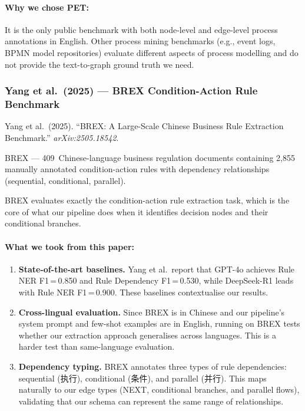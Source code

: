 \documentclass[12pt,a4paper]{article}
\begin{document}
\paragraph{Why we chose PET:} It is the only public benchmark with both node-level and edge-level process annotations in English. Other process mining benchmarks (e.g., event logs, BPMN model repositories) evaluate different aspects of process modelling and do not provide the text-to-graph ground truth we need.

\subsubsection{Yang et al.\ (2025) --- BREX Condition-Action Rule Benchmark}
\label{sec:brex}

\begin{description}[leftmargin=2em]
    \item[Paper:] Yang et al.\ (2025). ``BREX: A Large-Scale Chinese Business Rule Extraction Benchmark.'' \textit{arXiv:2505.18542}.
    \item[Dataset:] BREX --- 409~Chinese-language business regulation documents containing 2,855 manually annotated condition-action rules with dependency relationships (sequential, conditional, parallel).
    \item[Relevance:] BREX evaluates exactly the condition-action rule extraction task, which is the core of what our pipeline does when it identifies decision nodes and their conditional branches.
\end{description}

\paragraph{What we took from this paper:}
\begin{enumerate}[leftmargin=2em]
    \item \textbf{State-of-the-art baselines.} Yang et al.\ report that GPT-4o achieves Rule NER F1\,=\,0.850 and Rule Dependency F1\,=\,0.530, while DeepSeek-R1 leads with Rule NER F1\,=\,0.900. These baselines contextualise our results.
    \item \textbf{Cross-lingual evaluation.} Since BREX is in Chinese and our pipeline's system prompt and few-shot examples are in English, running on BREX tests whether our extraction approach generalises across languages. This is a harder test than same-language evaluation.
    \item \textbf{Dependency typing.} BREX annotates three types of rule dependencies: sequential (执行), conditional (条件), and parallel (并行). This maps naturally to our edge types (NEXT, conditional branches, and parallel flows), validating that our schema can represent the same range of relationships.
\end{enumerate}
\end{document}

